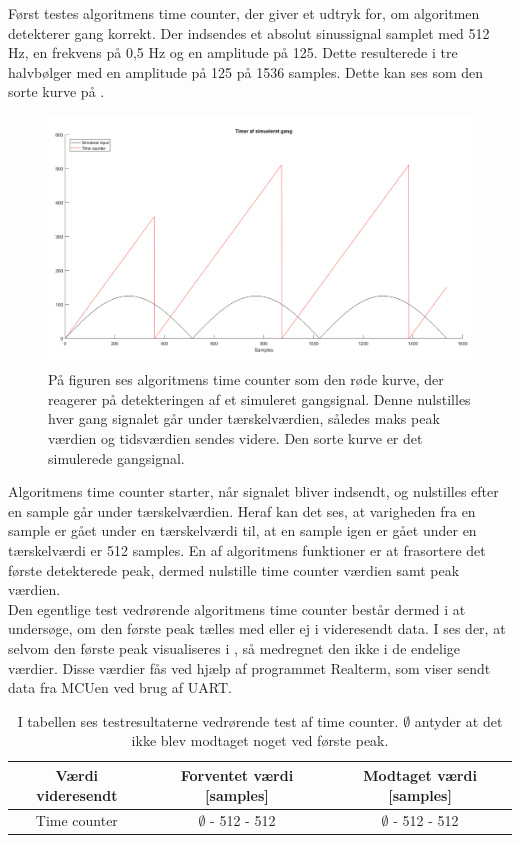 Først testes algoritmens time counter, der giver et udtryk for, om algoritmen detekterer gang korrekt. Der indsendes et absolut sinussignal samplet med 512 Hz, en frekvens på 0,5 Hz og en amplitude på 125. Dette resulterede i tre halvbølger med en amplitude på 125 på 1536 samples. Dette kan ses som den sorte kurve på .
\begin{figure}[H]
	\centering
	\includegraphics[scale=0.3]{figures/cDesign/test_timecount_gang.png}
	\caption{På figuren ses algoritmens time counter som den røde kurve, der reagerer på detekteringen af et simuleret gangsignal. Denne nulstilles hver gang signalet går under tærskelværdien, således maks peak værdien og tidsværdien sendes videre. Den sorte kurve er det simulerede gangsignal.}
	\label{fig:testgraf_timecounter}
\end{figure}
Algoritmens time counter starter, når signalet bliver indsendt, og nulstilles efter en sample går under tærskelværdien. Heraf kan det ses, at varigheden fra en sample er gået under en tærskelværdi til, at en sample igen er gået under en tærskelværdi er 512 samples. En af algoritmens funktioner er at frasortere det første detekterede peak, dermed nulstille time counter værdien samt peak værdien.\\
Den egentlige test vedrørende algoritmens time counter består dermed i at undersøge, om den første peak tælles med eller ej i videresendt data. I  ses der, at selvom den første peak visualiseres i , så medregnet den ikke i de endelige værdier. Disse værdier fås ved hjælp af programmet Realterm, som viser sendt data fra MCUen ved brug af UART.
\begin{table}[H]
	\centering
	\begin{tabular}{ccc}
		\hline
		\rowcolor[HTML]{C0C0C0} 
		Værdi videresendt & Forventet værdi [samples] & Modtaget værdi [samples] \\ \hline
		Time counter & $\emptyset$ - 512 - 512 & $\emptyset$ - 512 - 512 \\ \hline
	\end{tabular}
	\caption{I tabellen ses testresultaterne vedrørende test af time counter. $\emptyset$ antyder at det ikke blev modtaget noget ved første peak.}
	\label{tab:test_res_timecount}
\end{table} \vspace{-0.5cm}
